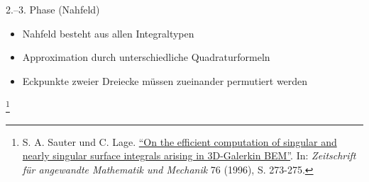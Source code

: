 \documentclass[10pt]{beamer}
\let\svthefootnote\thefootnote
\begin{document}
\begin{frame}{2.--3. Phase (Nahfeld)}
  \begin{itemize}
    \item Nahfeld besteht aus allen Integraltypen
    \item Approximation durch unterschiedliche Quadraturformeln
    \item Eckpunkte zweier Dreiecke müssen zueinander permutiert werden
  \end{itemize}
  
  \footnotesize
  \let\thefootnote\relax\footnote{S. A. Sauter und C. Lage.
  \href{https://link.springer.com/article/10.1007\%2Fs00211-015-0757-y}{
  ``On the efficient computation of singular and nearly singular surface 
  integrals arising in 3D-Galerkin BEM''}. In:   \textit{Zeitschrift f\"ur 
  angewandte Mathematik und Mechanik } 76 (1996), S. 273-275.}
  \addtocounter{footnote}{-1}\let\thefootnote\svthefootnote\relax
  \normalsize
\end{frame}
\end{document}
